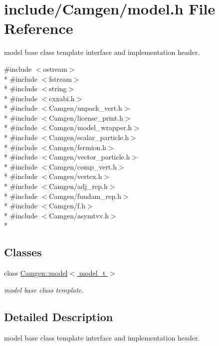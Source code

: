 \hypertarget{a00696}{}\section{include/\+Camgen/model.h File Reference}
\label{a00696}


model base class template interface and implementation header.  


{\ttfamily \#include $<$ostream$>$}\\*
{\ttfamily \#include $<$fstream$>$}\\*
{\ttfamily \#include $<$string$>$}\\*
{\ttfamily \#include $<$cxxabi.\+h$>$}\\*
{\ttfamily \#include $<$Camgen/unpack\+\_\+vert.\+h$>$}\\*
{\ttfamily \#include $<$Camgen/license\+\_\+print.\+h$>$}\\*
{\ttfamily \#include $<$Camgen/model\+\_\+wrapper.\+h$>$}\\*
{\ttfamily \#include $<$Camgen/scalar\+\_\+particle.\+h$>$}\\*
{\ttfamily \#include $<$Camgen/fermion.\+h$>$}\\*
{\ttfamily \#include $<$Camgen/vector\+\_\+particle.\+h$>$}\\*
{\ttfamily \#include $<$Camgen/comp\+\_\+vert.\+h$>$}\\*
{\ttfamily \#include $<$Camgen/vertex.\+h$>$}\\*
{\ttfamily \#include $<$Camgen/adj\+\_\+rep.\+h$>$}\\*
{\ttfamily \#include $<$Camgen/fundam\+\_\+rep.\+h$>$}\\*
{\ttfamily \#include $<$Camgen/f.\+h$>$}\\*
{\ttfamily \#include $<$Camgen/asymtvv.\+h$>$}\\*
\subsection*{Classes}
\begin{DoxyCompactItemize}
\item 
class \hyperlink{a00372}{Camgen\+::model$<$ model\+\_\+t $>$}
\begin{DoxyCompactList}\small\item\em model base class template. \end{DoxyCompactList}\end{DoxyCompactItemize}


\subsection{Detailed Description}
model base class template interface and implementation header. 

